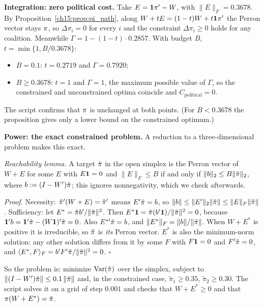 \documentclass[../solutions_manual.tex]{subfiles}
\begin{document}
 \textbf{Integration: zero political cost.} Take $E = \mathbf{1}\pi' - W$, with $\|E\|_F = 0.3678$. By Proposition~\ref{ch15:prop:pi_path}, along $W + tE = (1-t)W + t\mathbf{1}\pi'$ the Perron vector stays $\pi$, so $\Delta\pi_i = 0$ for every $i$ and the constraint $\Delta\pi_i \ge 0$ holds for any coalition. Meanwhile $\Gamma = 1 - (1-t)\cdot 0.2857$. With budget $B$, $t = \min\{1, B/0.3678\}$:
\begin{itemize}
\item $B = 0.1$: $t = 0.2719$ and $\Gamma = 0.7920$;
\item $B \ge 0.3678$: $t = 1$ and $\Gamma = 1$, the maximum possible value of $\Gamma$, so the constrained and unconstrained optima coincide and $C_{\text{political}} = 0$.
\end{itemize}
The script confirms that $\pi$ is unchanged at both points. (For $B < 0.3678$ the proposition gives only a lower bound on the constrained optimum.)

 \textbf{Power: the exact constrained problem.} A reduction to a three-dimensional problem makes this exact.

\emph{Reachability lemma.} A target $\tilde{\pi}$ in the open simplex is the Perron vector of $W + E$ for some $E$ with $E\mathbf{1} = 0$ and $\|E\|_F \le B$ if and only if $\|b\|_2 \le B\|\tilde{\pi}\|_2$, where $b := (I - W')\tilde{\pi}$; this ignores nonnegativity, which we check afterwards.

\emph{Proof.} Necessity: $\tilde{\pi}'(W + E) = \tilde{\pi}'$ means $E'\tilde{\pi} = b$, so $\|b\| \le \|E'\|_2\|\tilde{\pi}\| \le \|E\|_F\|\tilde{\pi}\|$. Sufficiency: let $E^* = \tilde{\pi} b'/\|\tilde{\pi}\|^2$. Then $E^*\mathbf{1} = \tilde{\pi}(b'\mathbf{1})/\|\tilde{\pi}\|^2 = 0$, because $\mathbf{1}'b = \mathbf{1}'\tilde{\pi} - (W\mathbf{1})'\tilde{\pi} = 0$. Also $E^{*\prime}\tilde{\pi} = b$, and $\|E^*\|_F = \|b\|/\|\tilde{\pi}\|$. When $W + E^*$ is positive it is irreducible, so $\tilde{\pi}$ is \emph{its} Perron vector. $E^*$ is also the minimum-norm solution: any other solution differs from it by some $F$ with $F\mathbf{1} = 0$ and $F'\tilde{\pi} = 0$, and $\langle E^*, F\rangle_F = b'F'\tilde{\pi}/\|\tilde{\pi}\|^2 = 0$. $\square$

So the problem is: minimize $\operatorname{Var}(\tilde{\pi})$ over the simplex, subject to $\|(I-W')\tilde{\pi}\| \le 0.1\,\|\tilde{\pi}\|$ and, in the constrained case, $\tilde\pi_1 \ge 0.35$, $\tilde\pi_2 \ge 0.30$. The script solves it on a grid of step $0.001$ and checks that $W + E^* \ge 0$ and that $\pi(W + E^*) = \tilde{\pi}$.
\end{document}
